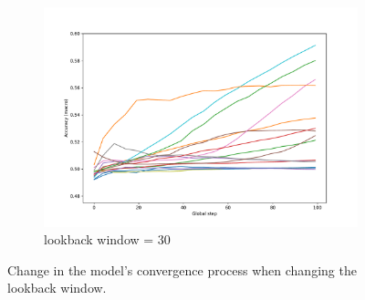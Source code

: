 \documentclass[aps,prb,groupedaddress,twocolumn,showpacs,dvipdfmx,superscriptaddress,pdftex]{revtex4-2}
\begin{document}
\begin{figure}
\begin{subfigure}[b]{\linewidth}
        \centering
        \includegraphics[width=\textwidth]{img/lstm_30.pdf}
        \caption{lookback window = 30}
        \label{fig:image3}
    \end{subfigure}
    \caption{Change in the model's convergence process when changing the lookback window.}
    \label{fig:three_images}
\end{figure}
\end{document}
